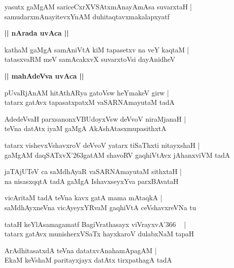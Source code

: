 \documentclass[twoside,12pt,openright]{book}
\def\S{\char'263}
\newcounter{shloka}[chapter]
\def\uvaca#1{\centerline{{\large\textbf{#1}}}}
\begin{document}
\begin{shloka}%
yasutx gaMgAM sariceCxrXVSAtxmAnayAmAsa suvarxtaH |\\
samudarxmAnayitevxYnAM duhitaqtavxmakalapxyatf
\end{shloka}

\uvaca{|| nArada uvAca ||}

\begin{shloka}%
kathaM gaMgA samAniVtA kiM tapasetxv na veY kaqtaM |\\
tatasxvaRM meV samAcakxvX suvarxtoVsi dayAnidheV 
\end{shloka}

\uvaca{|| mahAdeVva uvAca ||}

\begin{shloka}%
pUvaRjAnAM hitAthARya gatoVsw heYmakeV girw |\\
tatarx gatAvx tapasatxpatxM vaSARNAmayutaM tadA 
\end{shloka}

\begin{shloka}%
AdedeVvaH parxsanonxVBUdoyxVsw deVvoV niraMjanaH |\\
teVna datAtx iyaM gaMgA AkAshAtasxmupasithxtA
\end{shloka}

\begin{shloka}%
tatarx vishevxVshavxroV deVvoV yatarx tiSaThxti nitayxshaH |\\
gaMgAM daqSATxvX\S gatAM shavoRV gaqhiVtAvx jAhanxviVM tadA 
\end{shloka}

\begin{shloka}%
jaTAjUTeV ca saMdhAyaR vaSARNAmayutaM sithxtaH |\\
na nisasxqqtA tadA gaMgA IshavxseyxYva parxBAvataH 
\end{shloka}

\begin{shloka}%
vicAritaM tadA teVna kavx gatA mama mAtaqkA |\\
saMdhAyxneVna vicAyeyxYRvaM gaqhiVtA ceVshavxreVNa tu
\end{shloka}

\begin{shloka}%
tataH keYlAsamagamatf BagiVrathasayx viVrayxvA\char'366 ~ |\\
tatarx gatAvx munisherxVSaTx hayxkaroV dulabxNaM tapaH
\end{shloka}

\begin{shloka}%
ArAdhitasatxdA teVna datatxvAnahamApagAM |\\
EkaM keVshaM paritayxjayx datAtx tirxpathagA tadA 
\end{shloka}
\end{document}

